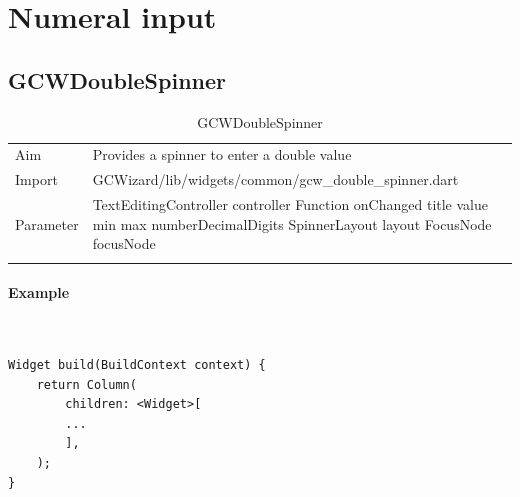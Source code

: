 \section{Numeral input}
\subsection{GCWDoubleSpinner}
\label{fig: GCWDoubleSpinner}
\begin{table}[H]
\begin{tabular}[h]{p{2cm}p{9cm}}
    \caption{GCWDoubleSpinner}
    Aim       & Provides a spinner to enter a double value\\
    Import    & GCWizard/lib/widgets/common/gcw\_double\_spinner.dart\\
    Parameter & TextEditingController controller\newline
                Function onChanged\newline
                title\newline
                value\newline
                min\newline
                max\newline
                numberDecimalDigits\newline
                SpinnerLayout layout\newline
                FocusNode focusNode\\
    \label{tab:GCWDoubleSpinner}
\end{tabular}
\end{table}
\paragraph*{Example} \,
\begin{lstlisting}
Widget build(BuildContext context) {
    return Column(
        children: <Widget>[
        ...
        ],
    );
}
\end{lstlisting}
\label{fig: ExampleGCWDoubleSpinner}

